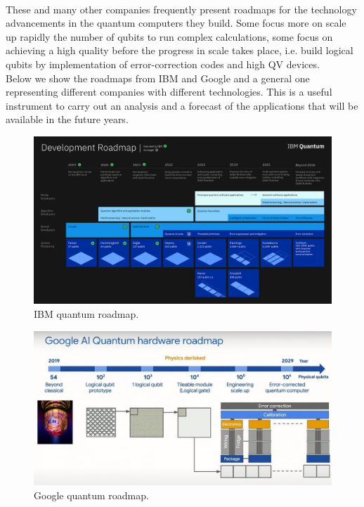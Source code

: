 \\
These and many other companies frequently present roadmaps for the technology advancements in the quantum computers they build. Some focus more on scale up rapidly the number of qubits to run complex calculations, some focus on achieving a high quality before the progress in scale takes place, i.e. build logical qubits by implementation of error-correction codes and high QV devices. \\
Below we show the roadmaps from IBM and Google and a general one representing different companies with different technologies. This is a useful instrument to carry out an analysis and a forecast of the applications that will be available in the future years.
\begin{figure}[ht]
  \centering
  \includegraphics[width=\textwidth]{figures/IBM Roadmap.png}
  \caption{IBM quantum roadmap.} \label{IBM Roadmap}
\end{figure}
\begin{figure}[ht]
  \centering
  \includegraphics[width=\textwidth]{figures/Google quantum roadmap.jpg}
  \caption{Google quantum roadmap.} \label{Google quantum roadmap}
\end{figure}
